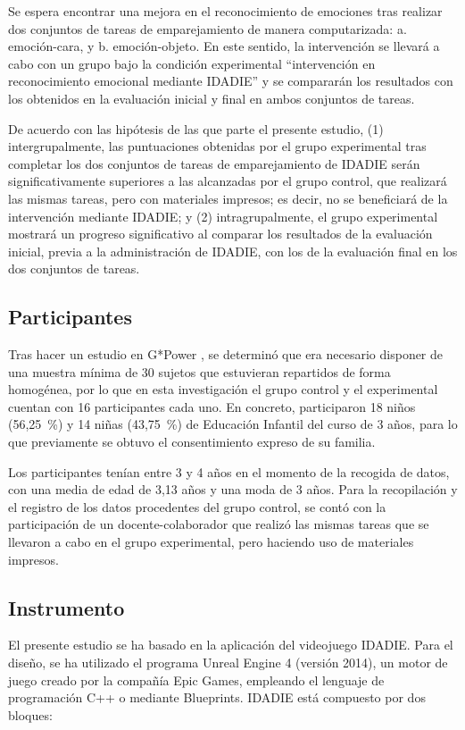 \documentclass[spanish]{textolivre}
\begin{document}
Se espera encontrar una mejora en el reconocimiento de emociones tras realizar dos conjuntos de tareas de emparejamiento de manera computarizada: a. emoción-cara, y b. emoción-objeto. En este sentido, la intervención se llevará a cabo con un grupo bajo la condición experimental “intervención en reconocimiento emocional mediante IDADIE” y se compararán los resultados con los obtenidos en la evaluación inicial y final en ambos conjuntos de tareas. 

De acuerdo con las hipótesis de las que parte el presente estudio, (1) intergrupalmente, las puntuaciones obtenidas por el grupo experimental tras completar los dos conjuntos de tareas de emparejamiento de IDADIE serán significativamente superiores a las alcanzadas por el grupo control, que realizará las mismas tareas, pero con materiales impresos; es decir, no se beneficiará de la intervención mediante IDADIE; y (2) intragrupalmente, el grupo experimental mostrará un progreso significativo al comparar los resultados de la evaluación inicial, previa a la administración de IDADIE, con los de la evaluación final en los dos conjuntos de tareas.


\subsection{Participantes}\label{sec-conduta}
Tras hacer un estudio en G*Power \cite{faul_statistical_2009}, se determinó que era necesario disponer de una muestra mínima de 30 sujetos que estuvieran repartidos de forma homogénea, por lo que en esta investigación el grupo control y el experimental cuentan con 16 participantes cada uno. En concreto, participaron 18 niños (56,25~\%) y 14 niñas (43,75~\%) de Educación Infantil del curso de 3 años, para lo que previamente se obtuvo el consentimiento expreso de su familia.

Los participantes tenían entre 3 y 4 años en el momento de la recogida de datos, con una media de edad de 3,13 años y una moda de 3 años. Para la recopilación y el registro de los datos procedentes del grupo control, se contó con la participación de un docente-colaborador que realizó las mismas tareas que se llevaron a cabo en el grupo experimental, pero haciendo uso de materiales impresos.


\subsection{Instrumento}\label{sec-fmt-manuscrito}
El presente estudio se ha basado en la aplicación del videojuego IDADIE. Para el diseño, se ha utilizado el programa Unreal Engine 4 (versión 2014), un motor de juego creado por la compañía Epic Games, empleando el lenguaje de programación C++ o mediante Blueprints. IDADIE está compuesto por dos bloques:
\end{document}
